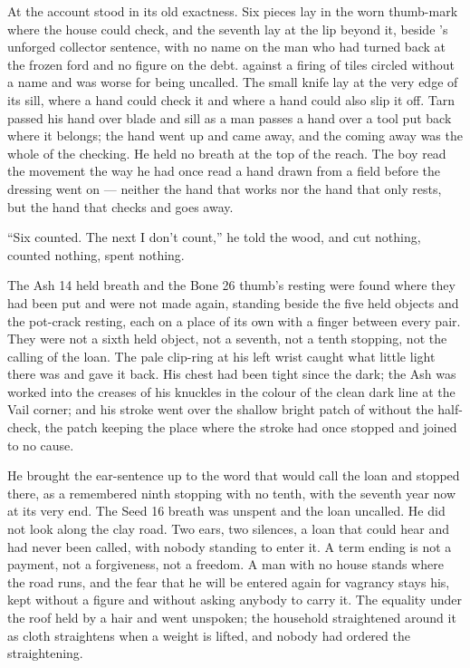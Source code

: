 At  the account stood in its old exactness. Six pieces lay in the worn thumb-mark where the house could check, and the seventh lay at the lip beyond it, beside 's unforged collector sentence, with no name on the man who had turned back at the frozen ford and no figure on the debt.  against a firing of tiles circled without a name and was worse for being uncalled. The small knife lay at the very edge of its sill, where a hand could check it and where a hand could also slip it off. Tarn passed his hand over blade and sill as a man passes a hand over a tool put back where it belongs; the hand went up and came away, and the coming away was the whole of the checking. He held no breath at the top of the reach. The boy read the movement the way he had once read a hand drawn from a field before the dressing went on --- neither the hand that works nor the hand that only rests, but the hand that checks and goes away.

“Six counted. The next I don't count,” he told the wood, and cut nothing, counted nothing, spent nothing.

The Ash 14 held breath and the Bone 26 thumb's resting were found where they had been put and were not made again, standing beside the five held objects and the pot-crack resting, each on a place of its own with a finger between every pair. They were not a sixth held object, not a seventh, not a tenth stopping, not the calling of the loan. The pale clip-ring at his left wrist caught what little light there was and gave it back. His chest had been tight since the dark; the Ash was worked into the creases of his knuckles in the colour of the clean dark line at the Vail corner; and his stroke went over the shallow bright patch of  without the half-check, the patch keeping the place where the stroke had once stopped and joined to no cause.

He brought the ear-sentence up to the word that would call the loan and stopped there, as a remembered ninth stopping with no tenth, with the seventh year now at its very end. The Seed 16 breath was unspent and the loan uncalled. He did not look along the clay road. Two ears, two silences, a loan that could hear and had never been called, with nobody standing to enter it. A term ending is not a payment, not a forgiveness, not a freedom. A man with no house stands where the road runs, and the fear that he will be entered again for vagrancy stays his, kept without a figure and without asking anybody to carry it. The equality under the roof held by a hair and went unspoken; the household straightened around it as cloth straightens when a weight is lifted, and nobody had ordered the straightening.

